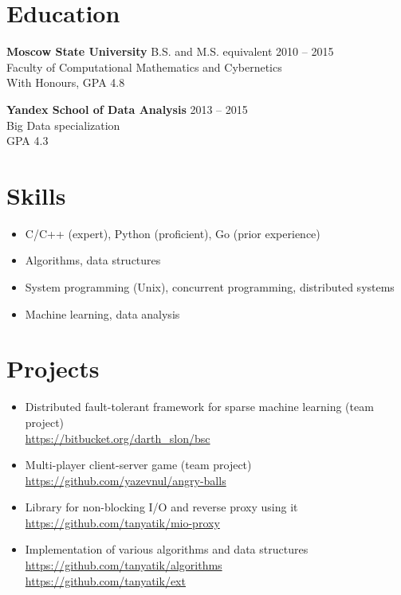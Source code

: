 \documentclass[margin]{res}
\begin{document}
\begin{resume}
\section{Education}
\textbf{Moscow State University} B.S. and M.S. equivalent \hfill 2010 -- 2015 \\
Faculty of Computational Mathematics and Cybernetics \\
With Honours, GPA 4.8

\textbf{Yandex School of Data Analysis} \hfill 2013 -- 2015 \\
Big Data specialization \\
GPA 4.3

\section{Skills}
\begin{itemize} \itemsep -2pt \topsep 0ex
\item C/C++ (expert), Python (proficient), Go (prior experience)
\item Algorithms, data structures
\item System programming (Unix), concurrent programming, distributed systems
\item Machine learning, data analysis
\end{itemize}

\section{Projects}
\begin{itemize} \itemsep -2pt \topsep 0ex
\item Distributed fault-tolerant framework for sparse machine learning (team project) \\
\url{https://bitbucket.org/darth_slon/bsc}
\item Multi-player client-server game (team project) \\
\url{https://github.com/yazevnul/angry-balls}
\item Library for non-blocking I/O and reverse proxy using it \\
\url{https://github.com/tanyatik/mio-proxy}
\item Implementation of various algorithms and data structures \\
\url{https://github.com/tanyatik/algorithms} \\
\url{https://github.com/tanyatik/ext}
\end{itemize}


%
\end{resume}
\end{document}
